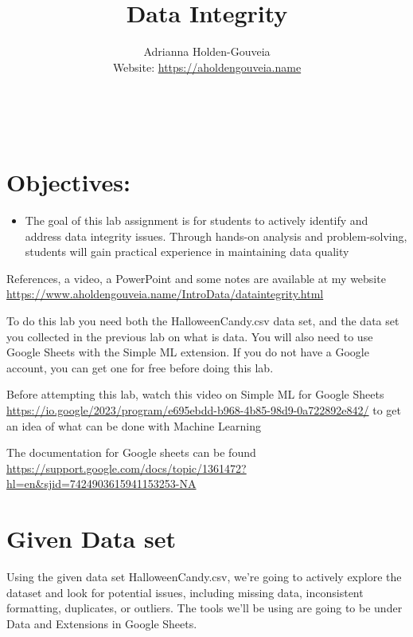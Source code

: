 \documentclass[12pt]{article}
\title{Data Integrity}
\author{
        Adrianna Holden-Gouveia \\
        Website: \url{https://aholdengouveia.name}\\ 
        \date{\vspace{-5ex}}
        \faLinkedin{: aholdengouveia} \\
        \faGithub {: aholdengouveia} \\
        }
\begin{document}
    

\maketitle


\section*{Objectives:}
\begin{itemize}
    \item The goal of this lab assignment is for students to actively identify and address data integrity issues. Through hands-on analysis and problem-solving, students will gain practical experience in maintaining data quality
\end{itemize}

References, a video, a PowerPoint and some notes are available at my website
\url {https://www.aholdengouveia.name/IntroData/dataintegrity.html}


To do this lab you need both the HalloweenCandy.csv data set, and the data set you collected in the previous lab on what is data. You will also need to use Google Sheets with the Simple ML extension.  If you do not have a Google account, you can get one for free before doing this lab.  

Before attempting this lab, watch this video on Simple ML for Google Sheets \url{https://io.google/2023/program/e695ebdd-b968-4b85-98d9-0a722892e842/} to get an idea of what can be done with Machine Learning

The documentation for Google sheets can be found \url{https://support.google.com/docs/topic/1361472?hl=en&sjid=7424903615941153253-NA}


\section*{Given Data set}

Using the given data set HalloweenCandy.csv, we're going to actively explore the dataset and look for potential issues, including missing data, inconsistent formatting, duplicates, or outliers. The tools we'll be using are going to be under Data and Extensions in Google Sheets. 
\end{document}
